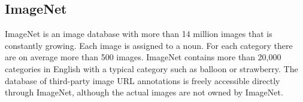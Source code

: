 %
%


\subsection{ImageNet}

ImageNet is an image database with more than 14 million images that is constantly growing. Each image is assigned to a noun. For each category there are on average more than 500 images. ImageNet contains more than 20,000 categories in English with a typical category such as \glqq balloon\grqq{} or \glqq strawberry\grqq. The database of third-party image URL annotations is freely accessible directly through ImageNet, although the actual images are not owned by ImageNet. \cite{Deng:2009,Shankar:2020,Krizhevsky:2012b}
